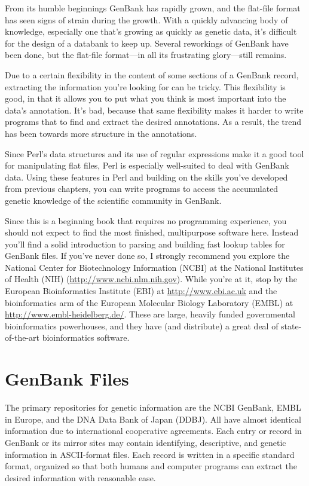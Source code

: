 From its humble beginnings GenBank has rapidly grown, and the flat-file format has seen signs of strain during the growth. With a quickly advancing body of knowledge, especially one that's growing as quickly as genetic data, it's difficult for the design of a databank to keep up. Several reworkings of GenBank have been done, but the flat-file format—in all its frustrating glory—still remains.

Due to a certain flexibility in the content of some sections of a GenBank record, extracting the information you're looking for can be tricky. This flexibility is good, in that it allows you to put what you think is most important into the data's annotation. It's bad, because that same flexibility makes it harder to write programs that to find and extract the desired annotations. As a result, the trend has been towards more structure in the annotations.

Since Perl's data structures and its use of regular expressions make it a good tool for manipulating flat files, Perl is especially well-suited to deal with GenBank data. Using these features in Perl and building on the skills you've developed from previous chapters, you can write programs to access the accumulated genetic knowledge of the scientific community in GenBank.

Since this is a beginning book that requires no programming experience, you should not expect to find the most finished, multipurpose software here. Instead you'll find a solid introduction to parsing and building fast lookup tables for GenBank files. If you've never done so, I strongly recommend you explore the National Center for Biotechnology Information (NCBI) at the National Institutes of Health (NIH) (\href{http://www.ncbi.nlm.nih.gov}{http://www.ncbi.nlm.nih.gov}). While you're at it, stop by the European Bioinformatics Institute (EBI) at \href{http://www.ebi.ac.uk}{http://www.ebi.ac.uk} and the bioinformatics arm of the European Molecular Biology Laboratory (EMBL) at \href{http://www.embl-heidelberg.de/}{http://www.embl-heidelberg.de/}. These are large, heavily funded governmental bioinformatics powerhouses, and they have (and distribute) a great deal of state-of-the-art bioinformatics software.

\section{GenBank Files}
The primary repositories for genetic information are the NCBI GenBank, EMBL in Europe, and the DNA Data Bank of Japan (DDBJ). All have almost identical information due to international cooperative agreements. Each entry or record in GenBank or its mirror sites may contain identifying, descriptive, and genetic information in ASCII-format files. Each record is written in a specific standard format, organized so that both humans and computer programs can extract the desired information with reasonable ease.

